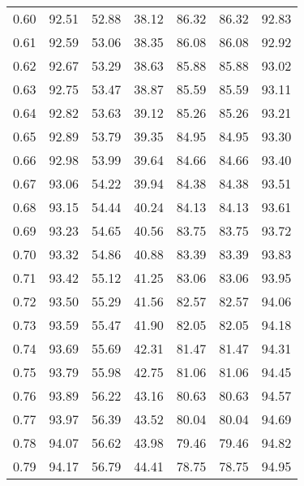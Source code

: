 \begin{tabular}{|c|c|c|c|c|c|c|}
      0.60 &     92.51 &     52.88 &      38.12 &   86.32 &      86.32 &         92.83 \\
      0.61 &     92.59 &     53.06 &      38.35 &   86.08 &      86.08 &         92.92 \\
      0.62 &     92.67 &     53.29 &      38.63 &   85.88 &      85.88 &         93.02 \\
      0.63 &     92.75 &     53.47 &      38.87 &   85.59 &      85.59 &         93.11 \\
      0.64 &     92.82 &     53.63 &      39.12 &   85.26 &      85.26 &         93.21 \\
      0.65 &     92.89 &     53.79 &      39.35 &   84.95 &      84.95 &         93.30 \\
      0.66 &     92.98 &     53.99 &      39.64 &   84.66 &      84.66 &         93.40 \\
      0.67 &     93.06 &     54.22 &      39.94 &   84.38 &      84.38 &         93.51 \\
      0.68 &     93.15 &     54.44 &      40.24 &   84.13 &      84.13 &         93.61 \\
      0.69 &     93.23 &     54.65 &      40.56 &   83.75 &      83.75 &         93.72 \\
      0.70 &     93.32 &     54.86 &      40.88 &   83.39 &      83.39 &         93.83 \\
      0.71 &     93.42 &     55.12 &      41.25 &   83.06 &      83.06 &         93.95 \\
      0.72 &     93.50 &     55.29 &      41.56 &   82.57 &      82.57 &         94.06 \\
      0.73 &     93.59 &     55.47 &      41.90 &   82.05 &      82.05 &         94.18 \\
      0.74 &     93.69 &     55.69 &      42.31 &   81.47 &      81.47 &         94.31 \\
      0.75 &     93.79 &     55.98 &      42.75 &   81.06 &      81.06 &         94.45 \\
      0.76 &     93.89 &     56.22 &      43.16 &   80.63 &      80.63 &         94.57 \\
      0.77 &     93.97 &     56.39 &      43.52 &   80.04 &      80.04 &         94.69 \\
      0.78 &     94.07 &     56.62 &      43.98 &   79.46 &      79.46 &         94.82 \\
      0.79 &     94.17 &     56.79 &      44.41 &   78.75 &      78.75 &         94.95 \\

\end{tabular}
